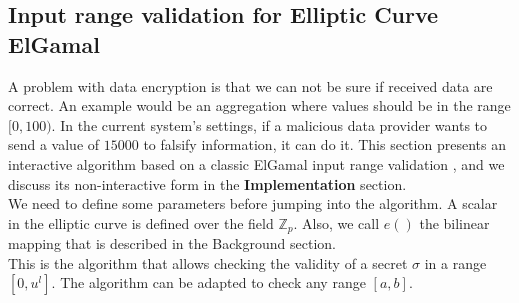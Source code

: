 \documentclass{article}
\begin{document}
\subsection{Input range validation for Elliptic Curve ElGamal}

A problem with data encryption is that we can not be sure if received data are correct. An example would be an aggregation where values should be in the range $[0,100)$. In the current system's settings, if a malicious data provider wants to send a value of $15000$ to falsify information, it can do it. This section presents an  interactive algorithm based on a classic ElGamal input range validation \cite{range}, and we discuss its non-interactive form in the \textbf{Implementation} section.\\
We need to define some parameters before jumping into the algorithm. A scalar in the elliptic curve is defined over the field $\mathbb{Z}_p$. Also, we call $e()$ the bilinear mapping that is described in the Background section.\\
This is the algorithm that allows checking the validity of a secret $\sigma$ in a range $ [0,u^l]$. The algorithm can be adapted to check any range $[a,b]$.\\
\end{document}
